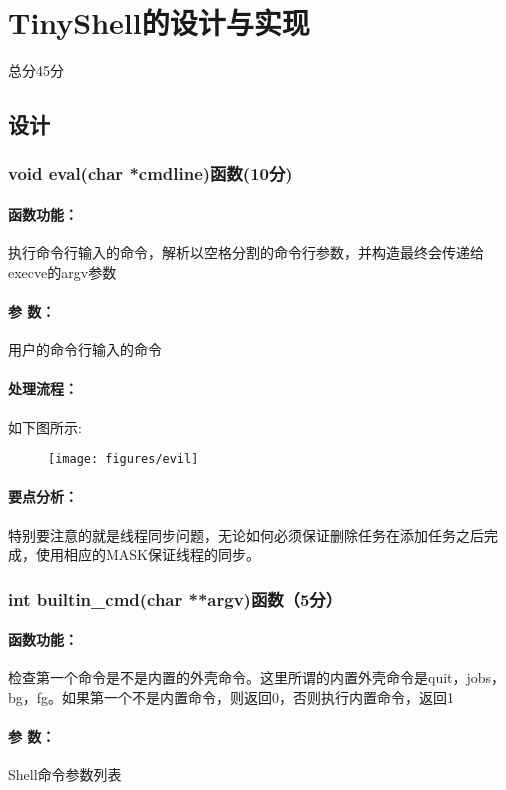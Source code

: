\section{TinyShell的设计与实现}
\begin{center}
    总分45分
\end{center}

\subsection{设计}

\subsubsection{void eval(char *cmdline)函数(10分)}

\paragraph{函数功能：}执行命令行输入的命令，解析以空格分割的命令行参数，并构造最终会传递给execve的argv参数
\paragraph{参   数：}用户的命令行输入的命令
\paragraph{处理流程：}如下图所示:
\begin{figure}[H]
    \centering 
    \texttt{[image: figures/evil]}
\end{figure}
\paragraph{要点分析：}特别要注意的就是线程同步问题，无论如何必须保证删除任务在添加任务之后完成，使用相应的MASK保证线程的同步。

\subsubsection{int builtin\_cmd(char **argv)函数（5分）}

\paragraph{函数功能：}检查第一个命令是不是内置的外壳命令。这里所谓的内置外壳命令是quit，jobs，bg，fg。如果第一个不是内置命令，则返回0，否则执行内置命令，返回1
\paragraph{参   数：}Shell命令参数列表
